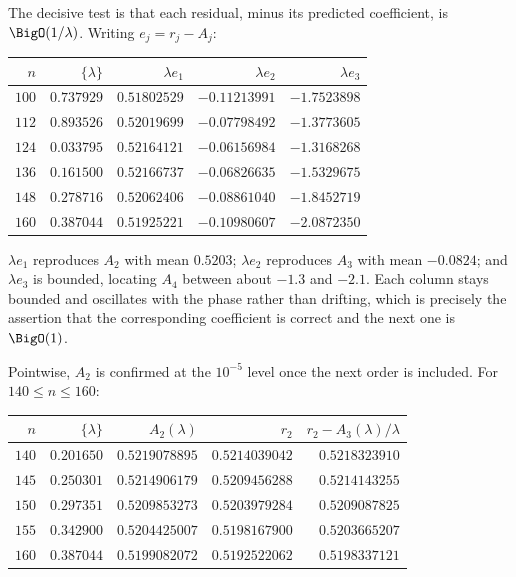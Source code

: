 \documentclass[11pt,oneside]{article}
\theoremstyle{definition}
\theoremstyle{remark}
\begin{document}
The decisive test is that each residual, minus its predicted coefficient, is
$\BigO(1/\lambda)$.  Writing $e_j=r_j-A_j$:

\begin{center}\small
\begin{tabular}{@{}rrrrr@{}}
\toprule
$n$ & $\{\lambda\}$ & $\lambda e_1$ & $\lambda e_2$ & $\lambda e_3$\\
\midrule
$100$ & $0.737929$ & $0.51802529$ & $-0.11213991$ & $-1.7523898$\\
$112$ & $0.893526$ & $0.52019699$ & $-0.07798492$ & $-1.3773605$\\
$124$ & $0.033795$ & $0.52164121$ & $-0.06156984$ & $-1.3168268$\\
$136$ & $0.161500$ & $0.52166737$ & $-0.06826635$ & $-1.5329675$\\
$148$ & $0.278716$ & $0.52062406$ & $-0.08861040$ & $-1.8452719$\\
$160$ & $0.387044$ & $0.51925221$ & $-0.10980607$ & $-2.0872350$\\
\bottomrule
\end{tabular}
\end{center}

$\lambda e_1$ reproduces $A_2$ with mean $0.5203$; $\lambda e_2$ reproduces
$A_3$ with mean $-0.0824$; and $\lambda e_3$ is bounded, locating $A_4$ between
about $-1.3$ and $-2.1$.  Each column stays bounded and oscillates with the
phase rather than drifting, which is precisely the assertion that the
corresponding coefficient is correct and the next one is $\BigO(1)$.

Pointwise, $A_2$ is confirmed at the $10^{-5}$ level once the next order is
included.  For $140\le n\le160$:

\begin{center}\small
\begin{tabular}{@{}rrrrr@{}}
\toprule
$n$ & $\{\lambda\}$ & $A_2(\lambda)$ & $r_2$ & $r_2-A_3(\lambda)/\lambda$\\
\midrule
$140$ & $0.201650$ & $0.5219078895$ & $0.5214039042$ & $0.5218323910$\\
$145$ & $0.250301$ & $0.5214906179$ & $0.5209456288$ & $0.5214143255$\\
$150$ & $0.297351$ & $0.5209853273$ & $0.5203979284$ & $0.5209087825$\\
$155$ & $0.342900$ & $0.5204425007$ & $0.5198167900$ & $0.5203665207$\\
$160$ & $0.387044$ & $0.5199082072$ & $0.5192522062$ & $0.5198337121$\\
\bottomrule
\end{tabular}
\end{center}
\end{document}
